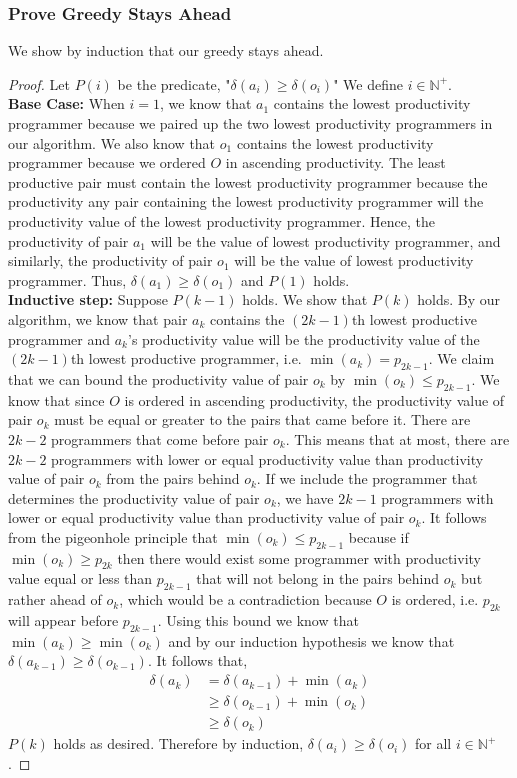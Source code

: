 \documentclass[11pt]{scrartcl}
\begin{document}
\subsubsection{
	Prove Greedy Stays Ahead
}
We show by induction that our greedy stays ahead.
\begin{proof}
	Let $P(i)$ be the predicate, "$\delta(a_i) \geq \delta(o_i)$"
	We define $i \in \mathbb{N}^+$. \\
	\textbf{Base Case:} When $i = 1$, we know that $a_1$ contains the lowest productivity programmer
	because we paired up the two lowest productivity programmers in our algorithm. We also know that
	$o_1$ contains the lowest productivity programmer because we ordered $O$ in ascending productivity.
	The least productive pair must contain the lowest productivity programmer because the
	productivity any pair containing the lowest productivity programmer will the productivity value of the
	lowest productivity programmer.
	Hence, the productivity of pair $a_1$ will be the value of lowest productivity programmer, and
	similarly, the productivity of pair $o_1$ will be the value of lowest productivity programmer.
	Thus, $\delta(a_1) \geq \delta(o_1)$ and $P(1)$ holds.\\
	\textbf{Inductive step:} Suppose $P(k-1)$ holds. We show that $P(k)$ holds.
	By our algorithm, we know that pair $a_k$ contains the $(2k-1)$th lowest productive
	programmer and $a_k$'s productivity value will be the productivity value of the
	$(2k-1)$th lowest productive programmer, i.e. $\min(a_k) = p_{2k-1}$.
	We claim that we can bound the productivity value of pair $o_k$ by
	$\min(o_k) \leq p_{2k-1}$. We know that since $O$ is ordered
	in ascending productivity, the productivity value of pair $o_k$ must be equal or greater
	to the pairs that came before it. There are $2k-2$ programmers that come before pair
	$o_k$. This means that at most, there are $2k-2$ programmers with lower or equal productivity value
	than productivity value of pair $o_k$ from the pairs behind $o_k$.
	If we include the programmer that determines the productivity value of pair $o_k$,
	we have $2k-1$ programmers with lower or equal productivity value
	than productivity value of pair $o_k$. It follows from the pigeonhole principle
	that $\min(o_k) \leq p_{2k-1}$ because if $\min(o_k) \geq p_{2k}$ then
	there would exist some programmer with productivity value equal or
	less than $p_{2k-1}$ that will not belong in the pairs behind $o_k$ but
	rather ahead of $o_k$, which would be a contradiction because $O$ is
	ordered, i.e. $p_{2k}$ will appear before $p_{2k-1}$.
	Using this bound we know that $\min(a_k)\geq \min(o_k)$ and by our induction
	hypothesis we know that $\delta(a_{k-1}) \geq \delta(o_{k-1})$. It follows that,
	\begin{align*}
		\delta(a_k) & = \delta(a_{k-1}) + \min(a_k)    \\
		            & \geq \delta(o_{k-1}) + \min(o_k) \\
		            & \geq \delta(o_k)
	\end{align*}
	$P(k)$ holds as desired. Therefore by induction, $\delta(a_i) \geq \delta(o_i)$ for all $i \in \mathbb{N}^+$.
\end{proof}
\end{document}
